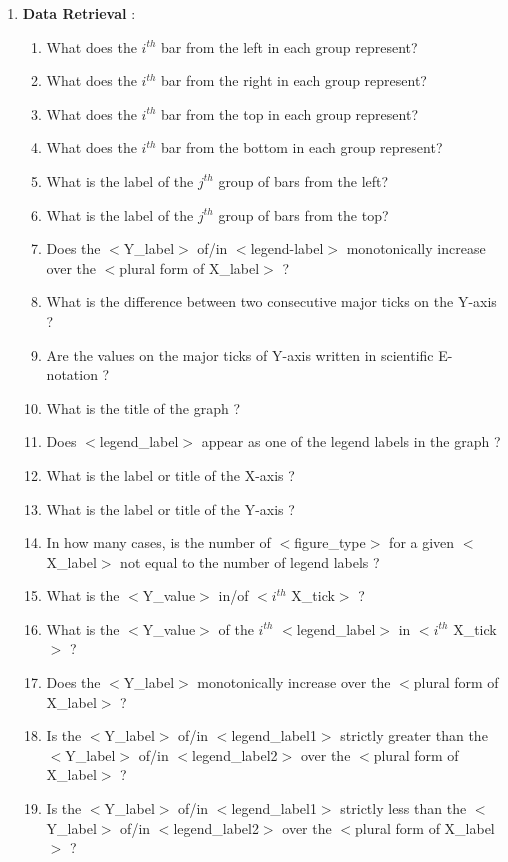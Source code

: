 \documentclass[10pt,twocolumn,letterpaper]{article}
\begin{document}
\begin{enumerate}
    \item \textbf{Data Retrieval} :
    \begin{enumerate}[1.]
        \item What does the $i^{th}$ bar from the left in each group represent?
        \item What does the $i^{th}$ bar from the right in each group represent?
        \item What does the $i^{th}$ bar from the top in each group represent?
        \item What does the $i^{th}$ bar from the bottom in each group represent?
        \item What is the label of the $j^{th}$ group of bars from the left?
        \item What is the label of the $j^{th}$ group of bars from the top?
        \item Does the $<$Y\_label$>$ of/in $<$legend-label$>$ monotonically increase over the $<$plural form of X\_label$>$ ?
        \item What is the difference between two consecutive major ticks on the Y-axis ?
        \item Are the values on the major ticks of Y-axis written in scientific E-notation ?
        \item What is the title of the graph ?
        \item Does $<$legend\_label$>$ appear as one of the legend labels in the graph ? 
        \item What is the label or title of the X-axis ?
        \item What is the label or title of the Y-axis ?
        \item In how many cases, is the number of $<$figure\_type$>$ for a given $<$X\_label$>$ not equal to the number of legend labels ?
        \item What is the $<$Y\_value$>$ in/of $<i^{th}$ X\_tick$>$ ?
        \item What is the $<$Y\_value$>$ of the $i^{th}$ $<$legend\_label$>$ in $<i^{th}$ X\_tick$>$ ?
        \item Does the $<$Y\_label$>$ monotonically increase over the $<$plural form of X\_label$>$ ?
        \item Is the $<$Y\_label$>$ of/in $<$legend\_label1$>$ strictly greater than the $<$Y\_label$>$ of/in $<$legend\_label2$>$ over the $<$plural form of X\_label$>$ ?
        \item Is the $<$Y\_label$>$ of/in $<$legend\_label1$>$ strictly less than the $<$Y\_label$>$ of/in $<$legend\_label2$>$ over the $<$plural form of X\_label$>$ ?
    \end{enumerate}
    

\end{enumerate}
\end{document}
